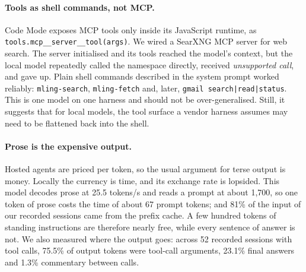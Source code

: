 \documentclass[11pt]{article}
\newcommand{\code}[1]{\texttt{#1}}
\begin{document}
\paragraph{Tools as shell commands, not MCP.} Code Mode exposes MCP tools only inside its JavaScript
runtime, as \code{tools.mcp\_\_server\_\_tool(args)}. We wired a SearXNG \cite{searxng} MCP server
for web search. The server initialised and its tools reached the model's context, but the local
model repeatedly called the namespace directly, received \emph{unsupported call}, and gave up.
Plain shell commands described in the system prompt worked reliably:
\code{mling-search}, \code{mling-fetch} and, later, \code{gmail search|read|status}. This is one
model on one harness and should not be over-generalised. Still, it suggests that for local models,
the tool surface a vendor harness assumes may need to be flattened back into the shell.

\paragraph{Prose is the expensive output.} Hosted agents are priced per token, so the usual argument
for terse output is money. Locally the currency is time, and its exchange rate is lopsided. This
model decodes prose at 25.5 tokens/s and reads a prompt at about 1{,}700, so one token of prose
costs the time of about 67 prompt tokens; and 81\% of the input of our recorded sessions came from
the prefix cache. A few hundred tokens of standing instructions are therefore nearly free, while
every sentence of answer is not. We also measured where the output goes: across 52 recorded
sessions with tool calls, 75.5\% of output tokens were tool-call arguments, 23.1\% final answers
and 1.3\% commentary between calls.
\end{document}
